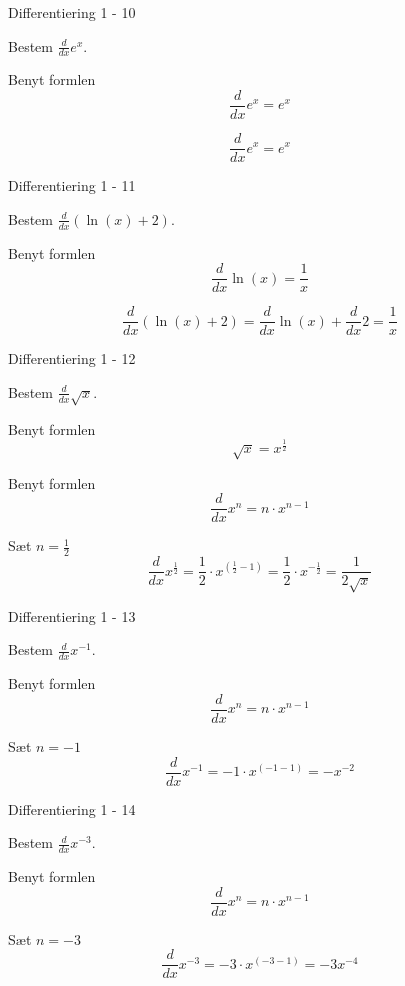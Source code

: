 \documentclass{article}
\begin{document}
\begin{exercise}{Differentiering 1 - 10}
	
	Bestem $\frac{d}{dx} e^x$.
	
	
	\hint
	
	Benyt formlen
	\[
	\frac{d}{dx} e^x = e^x
	\]
	
	\hint
	
	\[
	\frac{d}{dx} e^x = e^x
	\]
\end{exercise}

\begin{exercise}{Differentiering 1 - 11}
	
	Bestem $\frac{d}{dx}\left( \ln(x) + 2 \right)$.
	
	
	\hint
	
	Benyt formlen
	\[
	\frac{d}{dx} \ln(x) = \frac{1}{x}
	\]
	
	\hint
	
	\[
	\frac{d}{dx} \left( \ln(x) + 2 \right) =  \frac{d}{dx} \ln(x) + \frac{d}{dx} 2 =  \frac{1}{x}
	\]
\end{exercise}

\begin{exercise}{Differentiering 1 - 12}
	
	Bestem $\frac{d}{dx} \sqrt{x}$.
	
	
	\hint
	Benyt formlen
	\[
	\sqrt{x} = x^{\frac{1}{2}}
	\]
	
	\hint
	Benyt formlen
	\[
	\frac{d}{dx} x^n = n \cdot x^{n - 1}
	\]
	
	\hint
	
	Sæt $n = \frac{1}{2}$
	\[
	\frac{d}{dx} x^{\frac{1}{2}} = \frac{1}{2} \cdot x^{\left(\frac{1}{2} - 1\right)} = \frac{1}{2} \cdot x^{-\frac{1}{2}} = \frac{1}{2 \sqrt{x}}
	\]
\end{exercise}

\begin{exercise}{Differentiering 1 - 13}
	
	Bestem $\frac{d}{dx} x^{-1}$.
	
	
	\hint
	
	Benyt formlen
	\[
	\frac{d}{dx} x^n = n \cdot x^{n - 1}
	\]
	
	\hint
	
	Sæt $n = -1$
	\[
	\frac{d}{dx} x^{-1} = -1 \cdot x^{\left(-1 - 1\right)} = - x^{-2}
	\]
\end{exercise}

\begin{exercise}{Differentiering 1 - 14}
	
	Bestem $\frac{d}{dx} x^{-3}$.
	
	
	\hint
	
	Benyt formlen
	\[
	\frac{d}{dx} x^n = n \cdot x^{n - 1}
	\]
	
	\hint
	
	Sæt $n = -3$
	\[
	\frac{d}{dx} x^{-3} = -3 \cdot x^{\left( -3 - 1 \right)} = -3 x^{-4}
	\]
\end{exercise}
\end{document}

